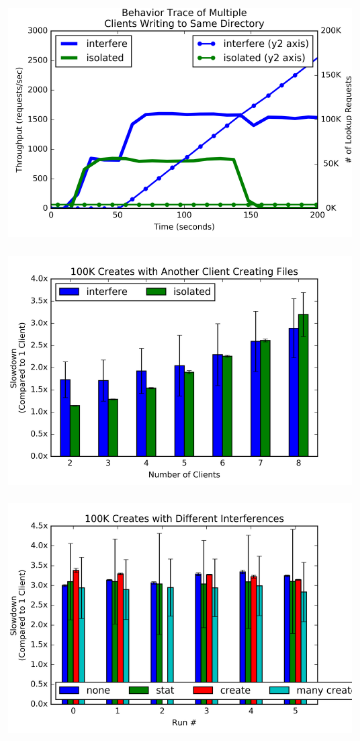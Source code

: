 \begin{figure}[t]
  \centering
  \begin{subfigure}[b]{.3\linewidth}
      \centering
      \includegraphics[width=1.0\linewidth]{graphs/behavior-interfere.png}
      \caption{}
      \label{fig:phy-design}
  \end{subfigure}
  \begin{subfigure}[b]{.3\linewidth}
      \centering
      \includegraphics[width=1.0\linewidth]{graphs/slowdown-interfere.png}
      \caption{}
      \label{fig:batching}
  \end{subfigure}
  \begin{subfigure}[b]{.3\linewidth}
      \centering
      \includegraphics[width=1.0\linewidth]{graphs/slowdown-interfere-types.png}

\end{subfigure}
\end{figure}
